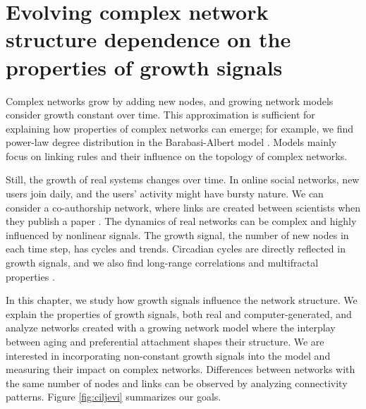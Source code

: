 
\chapter{Evolving complex network structure dependence on the properties of growth signals} %
\label{Ch:signals} %

Complex networks grow by adding new nodes, and growing network models consider growth constant over time. This approximation is sufficient for explaining how properties of complex networks can emerge; for example, 
we find power-law %
degree distribution in the Barabasi-Albert model \cite{barabasi1999}. %
Models mainly focus on linking rules and their influence on the topology of complex networks. 

Still, the growth of real systems changes over time. In online social networks, new users join daily, and the users' activity might have bursty nature. We can consider a co-authorship network, where links are created between scientists when they publish a paper \cite{barabasi2002evolution, newman2001structure}. %
The dynamics of real networks can be complex and highly influenced by nonlinear signals. The growth signal, the number of new nodes in each time step, has cycles and trends. Circadian cycles are directly reflected in growth signals, and we also find long-range correlations and multifractal properties \cite{fan2012fractal}. %

In this chapter, we study how growth signals influence the network structure. We explain the properties of growth signals, both real and computer-generated, and
analyze networks created with a growing network model where the interplay between aging and preferential attachment shapes their structure. We are interested in incorporating non-constant growth signals into the model and measuring their impact on complex networks. Differences between networks with the same number of nodes and links can be observed by analyzing connectivity patterns. Figure \ref{fig:ciljevi} summarizes our goals. 

